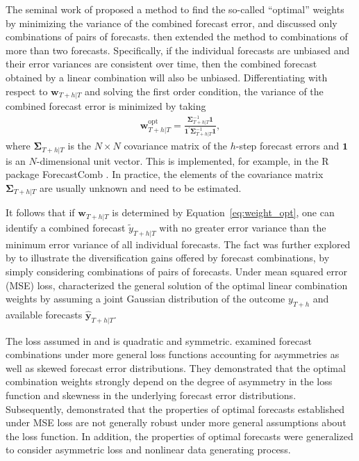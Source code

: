 \documentclass[11pt]{article}
\newcommand{\pkg}[1]{{\normalfont\fontseries{b}\selectfont #1}}
\let\proglang=\textsf
\begin{document}
The seminal work of \citet{Bates1969-yj} proposed a method to find the so-called ``optimal'' weights by minimizing the variance of the combined forecast error, and discussed only combinations of pairs of forecasts. \citet{Newbold1974-lp} then extended the method to combinations of more than two forecasts. Specifically, if the individual forecasts are unbiased and their error variances are consistent over time, then the combined forecast obtained by a linear combination will also be unbiased. Differentiating with respect to $\bm{w}_{T+h|T}$ and solving the first order condition, the variance of the combined forecast error is minimized by taking
\begin{align}
  \label{eq:weight_opt}
  \bm{w}_{T+h|T}^{\text{opt}}=\frac{\bm{\Sigma}_{T+h|T}^{-1}\bm{1}}{\bm{1}^{\prime} \bm{\Sigma}_{T+h|T}^{-1} \bm{1}},
\end{align}
where $\bm{\Sigma}_{T+h|T}$ is the $N \times N$ covariance matrix of the $h$-step forecast errors and $\bm{1}$ is an $N$-dimensional unit vector. This is implemented, for example, in the \proglang{R} package \pkg{ForecastComb} \citep{rForecastComb}. In practice, the elements of the covariance matrix $\bm{\Sigma}_{T+h|T}$ are usually unknown and need to be estimated.

It follows that if $\bm{w}_{T+h|T}$ is determined by Equation~\eqref{eq:weight_opt}, one can identify a combined forecast $\tilde{y}_{T+h|T}$ with no greater error variance than the minimum error variance of all individual forecasts. The fact was further explored by \citet{Timmermann2006-en} to illustrate the diversification gains offered by forecast combinations, by simply considering combinations of pairs of forecasts. Under mean squared error (MSE) loss, \citet{Timmermann2006-en} characterized the general solution of the optimal linear combination weights by assuming a joint Gaussian distribution of the outcome $y_{T+h}$ and available forecasts $\hat{\bm{y}}_{T+h|T}$.

The loss assumed in \citet{Bates1969-yj} and \citet{Newbold1974-lp} is quadratic and symmetric. \citet{Elliott2004-dz} examined forecast combinations under more general loss functions accounting for asymmetries as well as skewed forecast error distributions. They demonstrated that the optimal combination weights strongly depend on the degree of asymmetry in the loss function and skewness in the underlying forecast error distributions. Subsequently, \citet{Patton2007-zo} demonstrated that the properties of optimal forecasts established under MSE loss are not generally robust under more general assumptions about the loss function. In addition, the properties of optimal forecasts were generalized to consider asymmetric loss and nonlinear data generating process.
\end{document}
